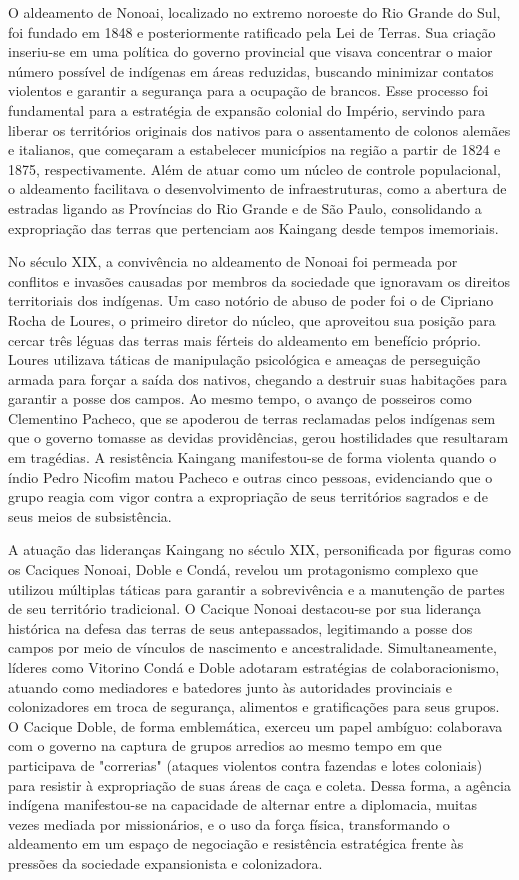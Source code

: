 \documentclass[12pt, a4paper]{article}
\begin{document}
O aldeamento de Nonoai, localizado no extremo noroeste do Rio Grande do Sul, foi fundado em 1848 e posteriormente ratificado pela Lei de Terras. Sua criação inseriu-se em uma política do governo provincial que visava concentrar o maior número possível de indígenas em áreas reduzidas, buscando minimizar contatos violentos e garantir a segurança para a ocupação de brancos. Esse processo foi fundamental para a estratégia de expansão colonial do Império, servindo para liberar os territórios originais dos nativos para o assentamento de colonos alemães e italianos, que começaram a estabelecer municípios na região a partir de 1824 e 1875, respectivamente. Além de atuar como um núcleo de controle populacional, o aldeamento facilitava o desenvolvimento de infraestruturas, como a abertura de estradas ligando as Províncias do Rio Grande e de São Paulo, consolidando a expropriação das terras que pertenciam aos Kaingang desde tempos imemoriais.  

No século XIX, a convivência no aldeamento de Nonoai foi permeada por conflitos e invasões causadas por membros da sociedade que ignoravam os direitos territoriais dos indígenas. Um caso notório de abuso de poder foi o de Cipriano Rocha de Loures, o primeiro diretor do núcleo, que aproveitou sua posição para cercar três léguas das terras mais férteis do aldeamento em benefício próprio. Loures utilizava táticas de manipulação psicológica e ameaças de perseguição armada para forçar a saída dos nativos, chegando a destruir suas habitações para garantir a posse dos campos. Ao mesmo tempo, o avanço de posseiros como Clementino Pacheco, que se apoderou de terras reclamadas pelos indígenas sem que o governo tomasse as devidas providências, gerou hostilidades que resultaram em tragédias. A resistência Kaingang manifestou-se de forma violenta quando o índio Pedro Nicofim matou Pacheco e outras cinco pessoas, evidenciando que o grupo reagia com vigor contra a expropriação de seus territórios sagrados e de seus meios de subsistência.

A atuação das lideranças Kaingang no século XIX, personificada por figuras como os Caciques Nonoai, Doble e Condá, revelou um protagonismo complexo que utilizou múltiplas táticas para garantir a sobrevivência e a manutenção de partes de seu território tradicional. O Cacique Nonoai destacou-se por sua liderança histórica na defesa das terras de seus antepassados, legitimando a posse dos campos por meio de vínculos de nascimento e ancestralidade. Simultaneamente, líderes como Vitorino Condá e Doble adotaram estratégias de colaboracionismo, atuando como mediadores e batedores junto às autoridades provinciais e colonizadores em troca de segurança, alimentos e gratificações para seus grupos. O Cacique Doble, de forma emblemática, exerceu um papel ambíguo: colaborava com o governo na captura de grupos arredios ao mesmo tempo em que participava de "correrias" (ataques violentos contra fazendas e lotes coloniais) para resistir à expropriação de suas áreas de caça e coleta. Dessa forma, a agência indígena manifestou-se na capacidade de alternar entre a diplomacia, muitas vezes mediada por missionários, e o uso da força física, transformando o aldeamento em um espaço de negociação e resistência estratégica frente às pressões da sociedade expansionista e colonizadora.
\end{document}
